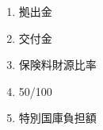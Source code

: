 \begin{answerbox}
  \begin{enumerate}[A: ]
    \item 拠出金
    \item 交付金
    \item 保険料財源比率
    \item 50/100
    \item 特別国庫負担額
  \end{enumerate}
\end{answerbox}

\newpage
